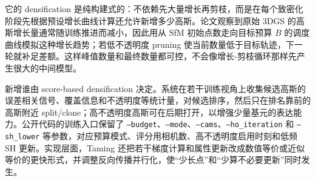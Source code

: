 它的 densification 是纯构建式的：不依赖先大量增长再剪枝，而是在每个致密化阶段先根据预设增长曲线计算还允许新增多少高斯。论文观察到原始 3DGS 的高斯增长量通常随训练推进而减小，因此用从 SfM 初始点数走向目标预算 $B$ 的调度曲线模拟这种增长趋势；若低不透明度 pruning 使当前数量低于目标轨迹，下一轮就补足差额。这样峰值数量和最终数量都可控，不会像增长-剪枝循环那样先产生很大的中间模型。

新增谁由 score-based densification 决定。系统在若干训练视角上收集候选高斯的误差相关信号、覆盖信息和不透明度等统计量，对候选排序，然后只在排名靠前的高斯附近 split/clone；高不透明度高斯可在后期打开，以增强少量基元的表达能力。公开代码的训练入口保留了 \texttt{--budget}、\texttt{--mode}、\texttt{--cams}、\texttt{--ho\_iteration} 和 \texttt{--sh\_lower} 等参数，对应预算模式、评分用相机数、高不透明度启用时刻和低频 SH 更新。实现层面，Taming 还把若干梯度计算和属性更新改成数值等价或近似等价的更快形式，并调整反向传播并行化，使“少长点”和“少算不必要更新”同时发生。

